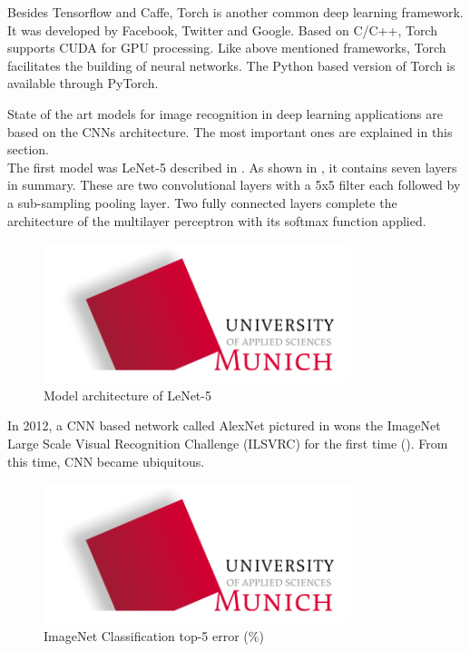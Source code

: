 Besides Tensorflow and Caffe, Torch is another common deep learning framework. It was developed by Facebook, Twitter and Google. Based on C/C++, Torch supports CUDA for GPU processing. Like above mentioned frameworks, Torch facilitates the building of neural networks. The Python based version of Torch is available through PyTorch.
		
State of the art models for image recognition in deep learning applications are based on the CNNs architecture. The most important ones are explained in this section. \\

The first model was LeNet-5 described in \citet{LeCun1998}. As shown in , it contains seven layers in summary. These are two convolutional layers with a 5x5 filter each followed by a sub-sampling pooling layer. Two fully connected layers complete the architecture of the multilayer perceptron with its softmax function applied.\\
	
\begin{figure}[htbp]
\includegraphics[width=0.8\textwidth]{includes/MUASlogo}
\caption[Model architecture of LeNet-5]{Model architecture of LeNet-5 \citep{LeCun1998}}
\label{fig:FH-Logo0}
\end{figure} 

In 2012, a CNN based network called AlexNet pictured in \citet{Krizhevsky2012} wons the ImageNet Large Scale Visual Recognition Challenge (ILSVRC) for the first time (). From this time, CNN became ubiquitous.\\

\begin{figure}[htbp]
\includegraphics[width=0.8\textwidth]{includes/MUASlogo}
\caption[ImageNet Classification top-5 error]{ImageNet Classification top-5 error (\%) \citep{He2016}}
\label{fig:FH-Logo1}
\end{figure}

